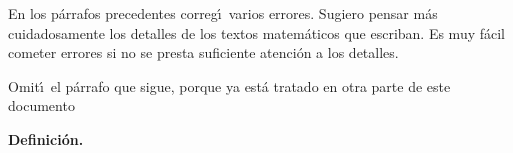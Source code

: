 \begin{myremark}
En los p\'arrafos precedentes correg\'\i\ varios errores.
Sugiero pensar m\'as cuidadosamente los detalles de los textos
matem\'aticos que escriban.
Es muy f\'acil cometer errores si no se presta suficiente atenci\'on
a los detalles.

Omit\'\i\ el p\'arrafo que sigue, porque ya est\'a tratado en otra
parte de este documento
 
{\bf Definici\'on.}

\end{myremark}
